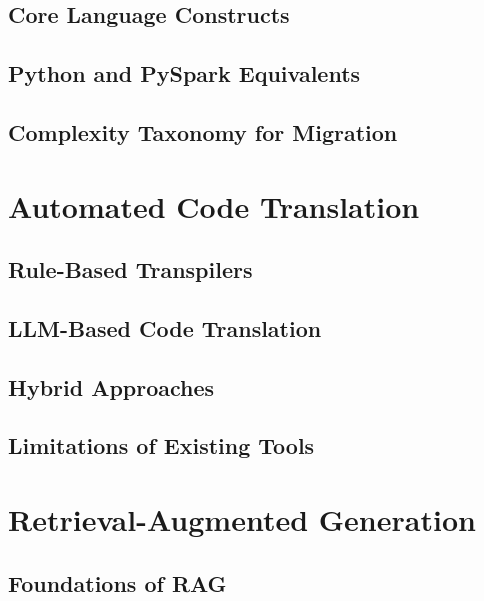 \documentclass[12pt,a4paper]{report}
\begin{document}
  \subsection{Core Language Constructs}
  \label{subsec:sas-constructs}

  \subsection{Python and PySpark Equivalents}
  \label{subsec:python-equivalents}

  \subsection{Complexity Taxonomy for Migration}
  \label{subsec:complexity-taxonomy}

\section{Automated Code Translation}
\label{sec:code-translation}

  \subsection{Rule-Based Transpilers}
  \label{subsec:rule-based}

  \subsection{LLM-Based Code Translation}
  \label{subsec:llm-translation}

  \subsection{Hybrid Approaches}
  \label{subsec:hybrid-translation}

  \subsection{Limitations of Existing Tools}
  \label{subsec:existing-limitations}

\section{Retrieval-Augmented Generation}
\label{sec:rag-theory}

  \subsection{Foundations of RAG}
  \label{subsec:rag-foundations}
\end{document}
